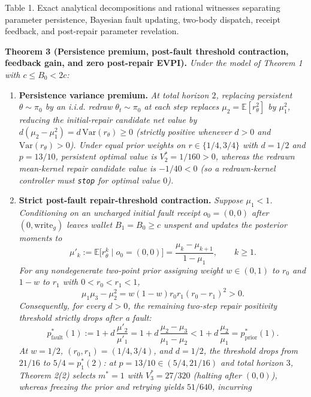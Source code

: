 \documentclass[11pt,a4paper]{article}
\providecommand{\tightlist}{\setlength{\itemsep}{2pt}\setlength{\parskip}{0pt}}
\begin{document}
Table 1. Exact analytical decompositions and rational witnesses
separating parameter persistence, Bayesian fault updating, two-body
dispatch, receipt feedback, and post-repair parameter revelation.

\textbf{Theorem 3 (Persistence premium, post-fault threshold
contraction, feedback gain, and zero post-repair EVPI).} \emph{Under the
model of Theorem 1 with \(c \le B_0 < 2c\):}

\begin{enumerate}
\def\labelenumi{\arabic{enumi}.}
\tightlist
\item
  \textbf{Persistence variance premium.} \emph{At total horizon \(2\),
  replacing persistent \(\theta \sim \pi_0\) by an i.i.d. redraw
  \(\theta_t \sim \pi_0\) at each step replaces
  \(\mu_2 = \mathbb{E}[r_\theta^2]\) by \(\mu_1^2\), reducing the
  initial-repair candidate net value by
  \(d(\mu_2 - \mu_1^2) = d\,\mathrm{Var}(r_\theta) \ge 0\) (strictly
  positive whenever \(d > 0\) and \(\mathrm{Var}(r_\theta) > 0\)). Under
  equal prior weights on \(r \in \{1/4, 3/4\}\) with \(d = 1/2\) and
  \(p = 13/10\), persistent optimal value is \(V_2^* = 1/160 > 0\),
  whereas the redrawn mean-kernel repair candidate value is
  \(-1/40 < 0\) (so a redrawn-kernel controller must \texttt{stop} for
  optimal value \(0\)).}
\item
  \textbf{Strict post-fault repair-threshold contraction.} \emph{Suppose
  \(\mu_1 < 1\). Conditioning on an uncharged initial fault receipt
  \(o_0 = (0,0)\) after \((0, \mathrm{write}_g)\) leaves wallet
  \(B_1 = B_0 \ge c\) unspent and updates the posterior moments to}
  \[\mu'_k := \mathbb{E}\bigl[r_\theta^k \mid o_0 = (0,0)\bigr] = \frac{\mu_k - \mu_{k+1}}{1 - \mu_1}, \qquad k \ge 1.\]
  \emph{For any nondegenerate two-point prior assigning weight
  \(w \in (0,1)\) to \(r_0\) and \(1 - w\) to \(r_1\) with
  \(0 < r_0 < r_1 < 1\),}
  \[\mu_1\mu_3 - \mu_2^2 = w(1 - w) r_0 r_1 (r_0 - r_1)^2 > 0.\]
  \emph{Consequently, for every \(d > 0\), the remaining two-step repair
  positivity threshold strictly drops after a fault:}
  \[p_{\mathrm{fault}}^*(1) := 1 + d\,\frac{\mu'_2}{\mu'_1} = 1 + d\,\frac{\mu_2 - \mu_3}{\mu_1 - \mu_2} < 1 + d\,\frac{\mu_2}{\mu_1} = p_{\mathrm{prior}}^*(1).\]
  \emph{At \(w = 1/2\), \((r_0, r_1) = (1/4, 3/4)\), and \(d = 1/2\),
  the threshold drops from \(21/16\) to \(5/4 = p_1^*(2)\): at
  \(p = 13/10 \in (5/4, 21/16)\) and total horizon \(3\), Theorem 2(2)
  selects \(m^* = 1\) with \(V_3^* = 27/320\) (halting after \((0,0)\)),
  whereas freezing the prior and retrying yields \(51/640\), incurring
}
\end{enumerate}
\end{document}

